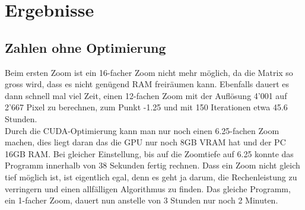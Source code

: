 \section{Ergebnisse}

\subsection{Zahlen ohne Optimierung}
Beim ersten Zoom ist ein 16-facher Zoom nicht mehr möglich, da die Matrix so gross wird, dass es nicht genügend RAM freiräumen kann. Ebenfalls dauert es dann schnell mal viel Zeit, einen 12-fachen Zoom mit der Auflösung 4'001 auf 2'667 Pixel zu berechnen, zum Punkt -1.25 und mit 150 Iterationen etwa 45.6 Stunden.\\
Durch die CUDA-Optimierung kann man nur noch einen 6.25-fachen Zoom machen, dies liegt daran das die GPU nur noch 8GB VRAM hat und der PC 16GB RAM. Bei gleicher Einstellung, bis auf die Zoomtiefe auf 6.25 konnte das Programm innerhalb von 38 Sekunden fertig rechnen. Dass ein Zoom nicht gleich tief möglich ist, ist eigentlich egal, denn es geht ja darum, die Rechenleistung zu verringern und einen allfälligen Algorithmus zu finden. Das gleiche Programm, ein 1-facher Zoom, dauert nun anstelle von 3 Stunden nur noch 2 Minuten.

